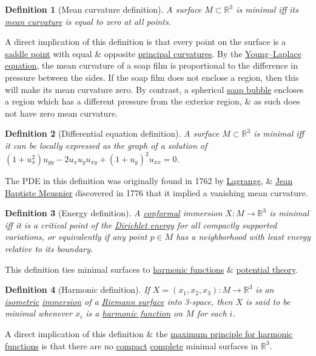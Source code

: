 \documentclass{article}
\newtheorem{definition}{Definition}
\begin{document}
\begin{definition}[Mean curvature definition]
	A surface $M\subset\mathbb{R}^3$ is minimal iff its \href{https://en.wikipedia.org/wiki/Mean_curvature}{mean curvature} is equal to zero at all points.
\end{definition}
A direct implication of this definition is that every point on the surface is a \href{https://en.wikipedia.org/wiki/Saddle_point}{saddle point} with equal \& opposite \href{https://en.wikipedia.org/wiki/Principal_curvatures}{principal curvatures}. By the \href{https://en.wikipedia.org/wiki/Young%E2%80%93Laplace_equation}{Young--Laplace equation}, the mean curvature of a soap film is proportional to the difference in pressure between the sides. If the soap film does not enclose a region, then this will make its mean curvature zero. By contrast, a spherical \href{https://en.wikipedia.org/wiki/Soap_bubble}{soap bubble} encloses a region which has a different pressure from the exterior region, \& as such does not have zero mean curvature.

\begin{definition}[Differential equation definition]
	A surface $M\subset\mathbb{R}^3$ is minimal iff it can be locally expressed as the graph of a solution of $(1 + u_x^2)u_{yy} - 2u_xu_yu_{xy} + (1 + u_y)^2u_{xx} = 0$.
\end{definition}
The PDE in this definition was originally found in 1762 by \href{https://en.wikipedia.org/wiki/Lagrange}{\sc Lagrange}, \& \href{https://en.wikipedia.org/wiki/Jean_Baptiste_Meusnier}{\sc Jean Baptiste Meusnier} discovered in 1776 that it implied a vanishing mean curvature.

\begin{definition}[Energy definition]
	A \href{https://en.wikipedia.org/wiki/Conformal_map}{conformal} immersion $X:M\to\mathbb{R}^3$ is minimal iff it is a critical point of the \href{https://en.wikipedia.org/wiki/Dirichlet_energy}{Dirichlet energy} for all compactly supported variations, or equivalently if any point $p\in M$ has a neighborhood with least energy relative to its boundary.
\end{definition}
This definition ties minimal surfaces to \href{https://en.wikipedia.org/wiki/Harmonic_functions}{harmonic functions} \& \href{https://en.wikipedia.org/wiki/Potential_theory}{potential theory}.

\begin{definition}[Harmonic definition]
	If $X = (x_1,x_2,x_3):M\to\mathbb{R}^3$ is an \href{https://en.wikipedia.org/wiki/Isometry}{isometric} \href{https://en.wikipedia.org/wiki/Immersion_(mathematics)}{immersion} of a \href{https://en.wikipedia.org/wiki/Riemann_surface}{Riemann surface} into 3-space, then $X$ is said to be \emph{minimal} whenever $x_i$ is a \href{https://en.wikipedia.org/wiki/Harmonic_function}{harmonic function} on $M$ for each $i$.
\end{definition}
A direct implication of this definition \& the \href{https://en.wikipedia.org/wiki/Harmonic_functions#Maximum_principle}{maximum principle for harmonic functions} is that there are no \href{https://en.wikipedia.org/wiki/Compact_space}{compact} \href{https://en.wikipedia.org/wiki/Complete_metric_space}{complete} minimal surfaces in $\mathbb{R}^3$.
\end{document}
